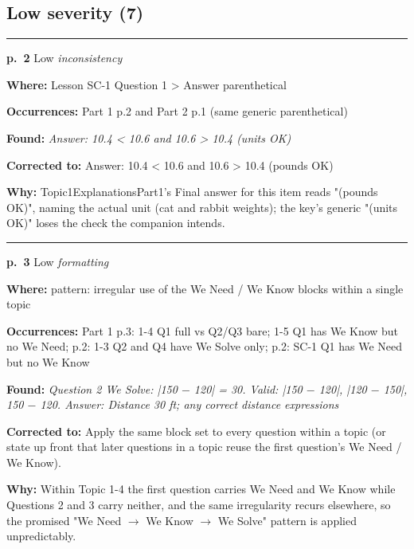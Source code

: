 \documentclass[11pt]{article}
\newcommand{\sevlow}[1]{\textcolor{black!55}{#1}}
\begin{document}
\subsection*{Low severity (7)}
\noindent\rule{\textwidth}{0.4pt}\par\nobreak\vspace{2pt}
\noindent\textbf{p.~2} \quad \sevlow{Low} \quad \textit{inconsistency}\par
\noindent\textbf{Where: }Lesson SC-1 Question 1 > Answer parenthetical\par
\noindent\textbf{Occurrences: }Part 1 p.2 and Part 2 p.1 (same generic parenthetical)\par
\noindent\textbf{Found: }\textit{Answer: 10.4 < 10.6 and 10.6 > 10.4 (units OK)}\par
\noindent\textbf{Corrected to: }Answer: 10.4 < 10.6 and 10.6 > 10.4 (pounds OK)\par
\noindent\textbf{Why: }Topic1ExplanationsPart1's Final answer for this item reads "(pounds OK)", naming the actual unit (cat and rabbit weights); the key's generic "(units OK)" loses the check the companion intends.\par\vspace{4pt}
\noindent\rule{\textwidth}{0.4pt}\par\nobreak\vspace{2pt}
\noindent\textbf{p.~3} \quad \sevlow{Low} \quad \textit{formatting}\par
\noindent\textbf{Where: }pattern: irregular use of the We Need / We Know blocks within a single topic\par
\noindent\textbf{Occurrences: }Part 1 p.3: 1-4 Q1 full vs Q2/Q3 bare; 1-5 Q1 has We Know but no We Need; p.2: 1-3 Q2 and Q4 have We Solve only; p.2: SC-1 Q1 has We Need but no We Know\par
\noindent\textbf{Found: }\textit{Question 2 We Solve: |150 $-$ 120| = 30. Valid: |150 $-$ 120|, |120 $-$ 150|, 150 $-$ 120. Answer: Distance 30 ft; any correct distance expressions}\par
\noindent\textbf{Corrected to: }Apply the same block set to every question within a topic (or state up front that later questions in a topic reuse the first question's We Need / We Know).\par
\noindent\textbf{Why: }Within Topic 1-4 the first question carries We Need and We Know while Questions 2 and 3 carry neither, and the same irregularity recurs elsewhere, so the promised "We Need $\to$ We Know $\to$ We Solve" pattern is applied unpredictably.\par\vspace{4pt}
\end{document}
